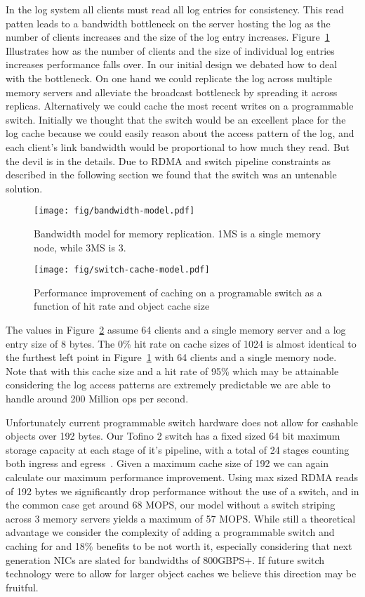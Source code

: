 \documentclass[12pt]{ucsddissertation}
\begin{document}
In the log system all clients must read all log entries for consistency. This read patten leads to a
bandwidth bottleneck on the server hosting the log as the number of clients increases and the size
of the log entry increases.  Figure~\ref{fig:bandwidth-model} Illustrates how as the number of
clients and the size of individual log entries increases performance falls over. In our initial
design we debated how to deal with the bottleneck. On one hand we could replicate the log across
multiple memory servers and alleviate the broadcast bottleneck by spreading it across replicas.
Alternatively we could cache the most recent writes on a programmable switch.  Initially we thought
that the switch would be an excellent place for the log cache because we could easily reason about
the access pattern of the log, and each client's link bandwidth would be proportional to how much
they read. But the devil is in the details. Due to RDMA and switch pipeline constraints as described
in the following section we found that the switch was an untenable solution.

\begin{figure}
\centering
\texttt{[image: fig/bandwidth-model.pdf]}
\caption{Bandwidth model for memory replication. 1MS is a single memory node, while 3MS is 3.}
\label{fig:bandwidth-model}
\end{figure}

\begin{figure}
    \centering
    \texttt{[image: fig/switch-cache-model.pdf]}
    \caption{Performance improvement of caching on a programable switch as a function of hit rate and object cache size}
    \label{fig:switch-cache-model}
\end{figure}

The values in Figure~\ref{fig:switch-cache-model} assume 64 clients and a single memory server and a
log entry size of 8 bytes. The 0\% hit rate on cache sizes of 1024 is almost identical to the
furthest left point in Figure~\ref{fig:bandwidth-model} with 64 clients and a single memory node.
Note that with this cache size and a hit rate of 95\% which may be attainable considering the log
access patterns are extremely predictable we are able to handle around 200 Million ops per second.

Unfortunately current programmable switch hardware does not allow for cashable objects over 192
bytes. Our Tofino 2 switch has a fixed sized 64 bit maximum storage capacity at each stage of it's
pipeline, with a total of 24 stages counting both ingress and egress~\cite{tofino2}. Given a maximum
cache size of 192 we can again calculate our maximum performance improvement. Using max sized RDMA
reads of 192 bytes we significantly drop performance without the use of a switch, and in the common
case get around 68 MOPS, our model without a switch striping across 3 memory servers yields a
maximum of 57 MOPS. While still a theoretical advantage we consider the complexity of adding a
programmable switch and caching for and 18\% benefits to be not worth it, especially considering
that next generation NICs are slated for bandwidths of 800GBPS+. If future switch technology were to
allow for larger object caches we believe this direction may be fruitful.
\end{document}
